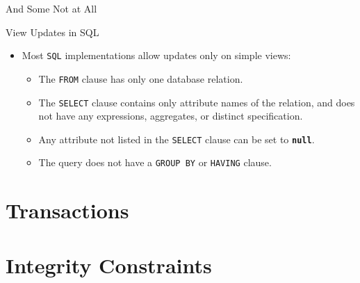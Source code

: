 \documentclass{beamer}
\begin{document}
\begin{frame}[fragile]{And Some Not at All}
\end{frame}

\begin{frame}{View Updates in SQL}
    \begin{itemize}
        \item Most \texttt{SQL} implementations allow updates only on simple views:
        \begin{itemize}
            \item The \texttt{FROM} clause has only one database relation.
            \item The \texttt{SELECT} clause contains only attribute names of the relation, and does not have any expressions, aggregates, or distinct specification.
            \item Any attribute not listed in the \texttt{SELECT} clause can be set to \texttt{\textbf{null}}.
            \item The query does not have a \texttt{GROUP BY} or \texttt{HAVING} clause.
        \end{itemize}
    \end{itemize}
\end{frame}










\section{Transactions}
\section{Integrity Constraints}
\end{document}

